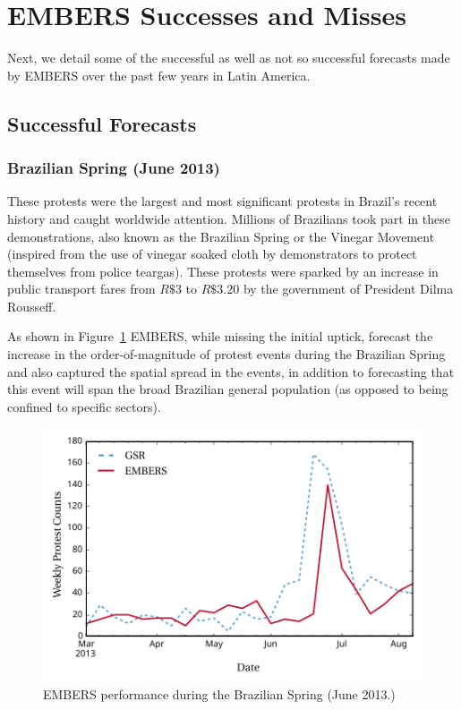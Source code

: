 \documentclass[11pt,a4paper,extrafontsizes,oneside]{article}
\begin{document}
\section{EMBERS Successes and Misses}
\label{sec:success}
Next, we detail
some of the successful as well as not so successful forecasts made by EMBERS over
the past few years in Latin America.
\subsection{Successful Forecasts}
\subsubsection*{Brazilian Spring (June 2013)}
These protests were the largest and most
significant protests in Brazil's recent history and caught worldwide
attention. Millions of Brazilians took part in these demonstrations,
also known as the Brazilian Spring or the Vinegar Movement (inspired
from the use of vinegar soaked cloth by demonstrators to protect
themselves from police teargas). These protests were
sparked by an increase in public transport fares from $R\$3$
to $R\$3.20$ by the government of President Dilma Rousseff.

As shown in Figure~\ref{fig:brazilJune13} EMBERS, while missing the initial uptick,
forecast the increase in the order-of-magnitude of protest events
during the Brazilian Spring and also captured
the spatial spread in the events, in addition to forecasting that this event
will span the broad Brazilian general population (as opposed to being confined to
specific sectors).

\begin{figure} \centering
\includegraphics[width=.8\columnwidth]{brazilJune13}
\caption{EMBERS performance during the Brazilian Spring (June 2013.)}
\label{fig:brazilJune13}
\end{figure}
\end{document}
